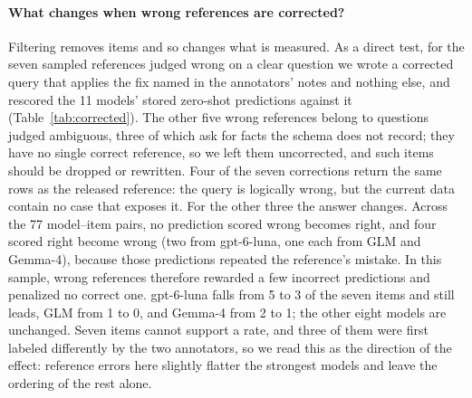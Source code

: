 \paragraph{What changes when wrong references are corrected?} Filtering removes items and so changes what is measured. As a direct test, for the seven sampled references judged wrong on a clear question we wrote a corrected query that applies the fix named in the annotators' notes and nothing else, and rescored the 11 models' stored zero-shot predictions against it (Table~\ref{tab:corrected}). The other five wrong references belong to questions judged ambiguous, three of which ask for facts the schema does not record; they have no single correct reference, so we left them uncorrected, and such items should be dropped or rewritten. Four of the seven corrections return the same rows as the released reference: the query is logically wrong, but the current data contain no case that exposes it. For the other three the answer changes. Across the 77 model--item pairs, no prediction scored wrong becomes right, and four scored right become wrong (two from gpt-6-luna, one each from GLM and Gemma-4), because those predictions repeated the reference's mistake. In this sample, wrong references therefore rewarded a few incorrect predictions and penalized no correct one. gpt-6-luna falls from 5 to 3 of the seven items and still leads, GLM from 1 to 0, and Gemma-4 from 2 to 1; the other eight models are unchanged. Seven items cannot support a rate, and three of them were first labeled differently by the two annotators, so we read this as the direction of the effect: reference errors here slightly flatter the strongest models and leave the ordering of the rest alone.

